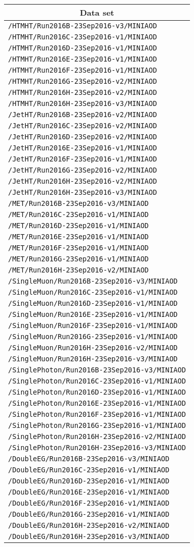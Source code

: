 \begin{center}
\begin{tabular}{l}
\hline\hline
\multicolumn{1}{c}{Data set}\tabularnewline
\hline
\verb!/HTMHT/Run2016B-23Sep2016-v3/MINIAOD!\tabularnewline
\verb!/HTMHT/Run2016C-23Sep2016-v1/MINIAOD!\tabularnewline
\verb!/HTMHT/Run2016D-23Sep2016-v1/MINIAOD!\tabularnewline
\verb!/HTMHT/Run2016E-23Sep2016-v1/MINIAOD!\tabularnewline
\verb!/HTMHT/Run2016F-23Sep2016-v1/MINIAOD!\tabularnewline
\verb!/HTMHT/Run2016G-23Sep2016-v2/MINIAOD!\tabularnewline
\verb!/HTMHT/Run2016H-23Sep2016-v2/MINIAOD!\tabularnewline
\verb!/HTMHT/Run2016H-23Sep2016-v3/MINIAOD!\tabularnewline
\verb!/JetHT/Run2016B-23Sep2016-v2/MINIAOD!\tabularnewline
\verb!/JetHT/Run2016C-23Sep2016-v2/MINIAOD!\tabularnewline
\verb!/JetHT/Run2016D-23Sep2016-v2/MINIAOD!\tabularnewline
\verb!/JetHT/Run2016E-23Sep2016-v1/MINIAOD!\tabularnewline
\verb!/JetHT/Run2016F-23Sep2016-v1/MINIAOD!\tabularnewline
\verb!/JetHT/Run2016G-23Sep2016-v2/MINIAOD!\tabularnewline
\verb!/JetHT/Run2016H-23Sep2016-v2/MINIAOD!\tabularnewline
\verb!/JetHT/Run2016H-23Sep2016-v3/MINIAOD!\tabularnewline
\verb!/MET/Run2016B-23Sep2016-v3/MINIAOD!\tabularnewline
\verb!/MET/Run2016C-23Sep2016-v1/MINIAOD!\tabularnewline
\verb!/MET/Run2016D-23Sep2016-v1/MINIAOD!\tabularnewline
\verb!/MET/Run2016E-23Sep2016-v1/MINIAOD!\tabularnewline
\verb!/MET/Run2016F-23Sep2016-v1/MINIAOD!\tabularnewline
\verb!/MET/Run2016G-23Sep2016-v1/MINIAOD!\tabularnewline
\verb!/MET/Run2016H-23Sep2016-v2/MINIAOD!\tabularnewline
\verb!/SingleMuon/Run2016B-23Sep2016-v3/MINIAOD!\tabularnewline
\verb!/SingleMuon/Run2016C-23Sep2016-v1/MINIAOD!\tabularnewline
\verb!/SingleMuon/Run2016D-23Sep2016-v1/MINIAOD!\tabularnewline
\verb!/SingleMuon/Run2016E-23Sep2016-v1/MINIAOD!\tabularnewline
\verb!/SingleMuon/Run2016F-23Sep2016-v1/MINIAOD!\tabularnewline
\verb!/SingleMuon/Run2016G-23Sep2016-v1/MINIAOD!\tabularnewline
\verb!/SingleMuon/Run2016H-23Sep2016-v2/MINIAOD!\tabularnewline
\verb!/SingleMuon/Run2016H-23Sep2016-v3/MINIAOD!\tabularnewline
\verb!/SinglePhoton/Run2016B-23Sep2016-v3/MINIAOD!\tabularnewline
\verb!/SinglePhoton/Run2016C-23Sep2016-v1/MINIAOD!\tabularnewline
\verb!/SinglePhoton/Run2016D-23Sep2016-v1/MINIAOD!\tabularnewline
\verb!/SinglePhoton/Run2016E-23Sep2016-v1/MINIAOD!\tabularnewline
\verb!/SinglePhoton/Run2016F-23Sep2016-v1/MINIAOD!\tabularnewline
\verb!/SinglePhoton/Run2016G-23Sep2016-v1/MINIAOD!\tabularnewline
\verb!/SinglePhoton/Run2016H-23Sep2016-v2/MINIAOD!\tabularnewline
\verb!/SinglePhoton/Run2016H-23Sep2016-v3/MINIAOD!\tabularnewline
\verb!/DoubleEG/Run2016B-23Sep2016-v3/MINIAOD!\tabularnewline
\verb!/DoubleEG/Run2016C-23Sep2016-v1/MINIAOD!\tabularnewline
\verb!/DoubleEG/Run2016D-23Sep2016-v1/MINIAOD!\tabularnewline
\verb!/DoubleEG/Run2016E-23Sep2016-v1/MINIAOD!\tabularnewline
\verb!/DoubleEG/Run2016F-23Sep2016-v1/MINIAOD!\tabularnewline
\verb!/DoubleEG/Run2016G-23Sep2016-v1/MINIAOD!\tabularnewline
\verb!/DoubleEG/Run2016H-23Sep2016-v2/MINIAOD!\tabularnewline
\verb!/DoubleEG/Run2016H-23Sep2016-v3/MINIAOD!\tabularnewline
\hline
\end{tabular}\end{center}
